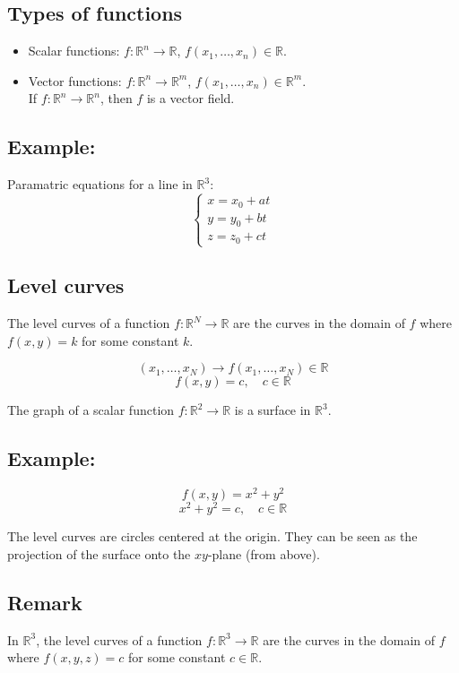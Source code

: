 \documentclass[11pt]{article}
\begin{document}
\subsection{Types of functions}
\begin{itemize}
    \item Scalar functions: $f : \mathbb{R}^n \rightarrow \mathbb{R}$, \quad $f(x_1, \dots , x_n) \in \mathbb{R}$.
    \item Vector functions: $f : \mathbb{R}^n \rightarrow \mathbb{R}^m$, \quad $f(x_1, \dots , x_n) \in \mathbb{R}^m$. \\
                         If $f : \mathbb{R}^n \rightarrow \mathbb{R}^n$, then $f$ is a vector field.
\end{itemize}

\subsection*{Example:}
Paramatric equations for a line in $\mathbb{R}^3$:
\[
\begin{cases}
x = x_0 + at \\
y = y_0 + bt \\
z = z_0 + ct
\end{cases}
\]

\subsection{Level curves}
The level curves of a function $f : \mathbb{R}^N \rightarrow \mathbb{R}$ are the curves in the domain of $f$ where $f(x,y) = k$ for some constant $k$.

\[
(x_1, \dots , x_N) \rightarrow f(x_1, \dots , x_N) \in \mathbb{R}
\]
\[
f(x,y) = c, \quad c \in \mathbb{R}
\]

The graph of a scalar function $f : \mathbb{R}^2 \rightarrow \mathbb{R}$ is a surface in $\mathbb{R}^3$.

\subsection*{Example:}
\[
f(x,y) = x^2 + y^2
\]
\[
x^2 + y^2 = c, \quad c \in \mathbb{R}
\]

The level curves are circles centered at the origin.
They can be seen as the projection of the surface onto the $xy$-plane (from above).

\subsection{Remark}
In $\mathbb{R}^3$, the level curves of a function $f : \mathbb{R}^3 \rightarrow \mathbb{R}$ are the curves in the domain of $f$ where $f(x,y,z) = c$ for some constant $c \in \mathbb{R}$.
\end{document}
